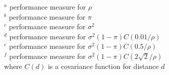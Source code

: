 \documentclass[12pt, titlepage]{article}
\begin{document}
\begin{table}[h]
\begin{center}
\begin{tabular}{c|rr|rr|rr|rr|rr}
   \hline
	\hline
\end{tabular}
\end{center}
$^a$ performance measure for $\rho$ \\
$^b$ performance measure for $\pi$ \\
$^c$ performance measure for $\sigma^2$ \\
$^d$ performance measure for $\sigma^2(1-\pi)C(0.01/\rho)$ \\
$^e$ performance measure for $\sigma^2(1-\pi)C(0.5/\rho)$ \\
$^f$ performance measure for $\sigma^2(1-\pi)C(2\sqrt{2}/\rho)$ \\
where $C(d)$ is a covariance function for distance $d$ \\
\end{table}
\end{document}
